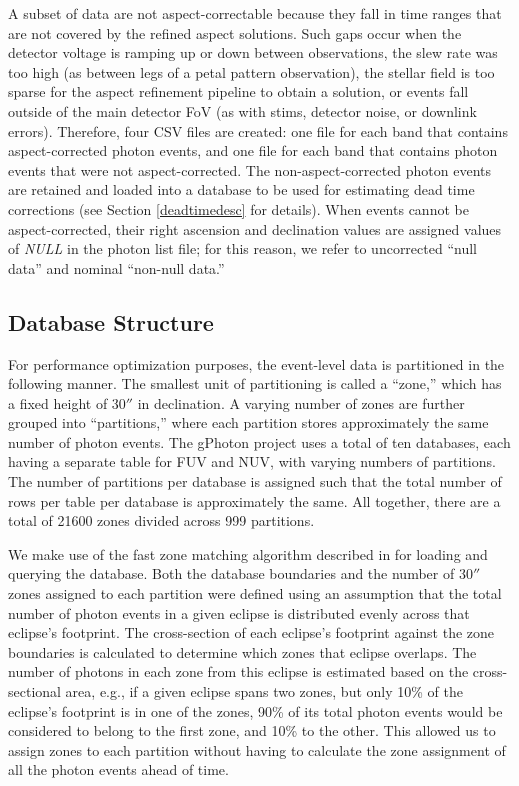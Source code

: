 \documentclass[preprint]{aastex}
\begin{document}
A subset of data are not aspect-correctable because they fall in time ranges that are not covered by the refined aspect solutions. Such gaps occur when the detector voltage is ramping up or down between observations, the slew rate was too high (as between legs of a petal pattern observation), the stellar field is too sparse for the aspect refinement pipeline to obtain a solution, or events fall outside of the main detector FoV (as with stims, detector noise, or downlink errors). Therefore, four CSV files are created: one file for each band that contains aspect-corrected photon events, and one file for each band that contains photon events that were not aspect-corrected. The non-aspect-corrected photon events are retained and loaded into a database to be used for estimating dead time corrections (see Section \ref{deadtimedesc} for details). When events cannot be aspect-corrected, their right ascension and declination values are assigned values of \emph{NULL} in the photon list file; for this reason, we refer to uncorrected ``null data'' and nominal ``non-null data.''

\subsection{Database Structure}
For performance optimization purposes, the event-level data is partitioned in the following manner.  The smallest unit of partitioning is called a ``zone,'' which has a fixed height of $30''$ in declination.  A varying number of zones are further grouped into ``partitions,'' where each partition stores approximately the same number of photon events. The gPhoton project uses a total of ten databases, each having a separate table for FUV and NUV, with varying numbers of partitions.  The number of partitions per database is assigned such that the total number of rows per table per database is approximately the same. All together, there are a total of 21600 zones divided across 999 partitions.

We make use of the fast zone matching algorithm described in \citet{gra2006} for loading and querying the database. Both the database boundaries and the number of $30''$ zones assigned to each partition were defined using an assumption that the total number of photon events in a given eclipse is distributed evenly across that eclipse's footprint. The cross-section of each eclipse's footprint against the zone boundaries is calculated to determine which zones that eclipse overlaps. The number of photons in each zone from this eclipse is estimated based on the cross-sectional area, e.g., if a given eclipse spans two zones, but only 10\% of the eclipse's footprint is in one of the zones, 90\% of its total photon events would be considered to belong to the first zone, and 10\% to the other.  This allowed us to assign zones to each partition without having to calculate the zone assignment of all the photon events ahead of time.
\end{document}
